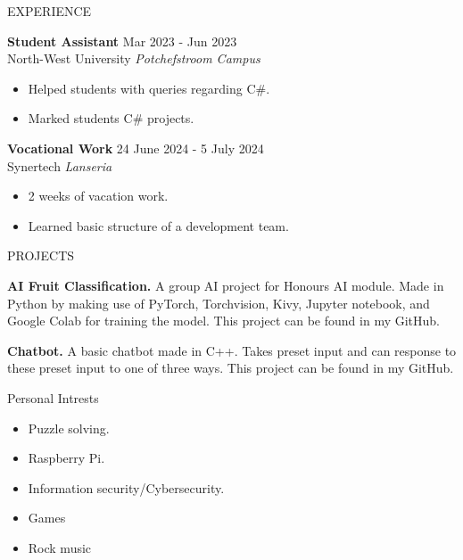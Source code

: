 \documentclass{resume} %
\begin{document}
\begin{rSection}{EXPERIENCE}

\textbf{Student Assistant} \hfill Mar 2023 - Jun 2023\\
North-West University \hfill \textit{Potchefstroom Campus}
\begin{itemize}
    \itemsep -3pt {} 
    \item Helped students with queries regarding C\#.
    \item Marked students C\# projects. 
\end{itemize}

\textbf{Vocational Work} \hfill 24 June 2024 - 5 July 2024\\
Synertech \hfill \textit{Lanseria}
\begin{itemize}
    \itemsep -3pt {} 
    \item 2 weeks of vacation work.
    \item Learned basic structure of a development team.
\end{itemize}

\end{rSection} 


\begin{rSection}{PROJECTS}
\vspace{-1.25em}
\item \textbf{AI Fruit Classification.} {A group AI project for Honours AI module. Made in Python by making use of PyTorch, Torchvision, Kivy, Jupyter notebook, and Google Colab for training the model. This project can be found in my GitHub.}
\item \textbf{Chatbot.} {A basic chatbot made in C++. Takes preset input and can response to these preset input to one of three ways. This project can be found in my GitHub.}
\end{rSection} 

\begin{rSection}{Personal Intrests} %
\begin{itemize}
    \item Puzzle solving.
    \item Raspberry Pi.
    \item Information security/Cybersecurity.
    \item Games
    \item Rock music
\end{itemize}


\end{rSection}
\end{document}
